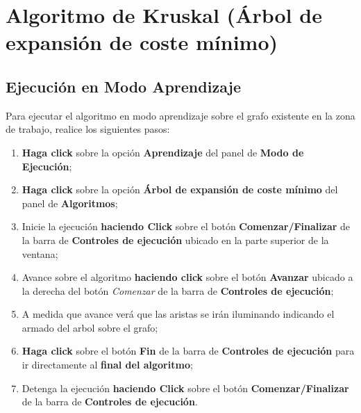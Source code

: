 \documentclass{book}
\begin{document}
%
%
\chapter{Algoritmo de Kruskal (Árbol de expansión de coste mínimo)}


\section{Ejecución en Modo Aprendizaje}

Para ejecutar el algoritmo en modo aprendizaje sobre el grafo existente en la zona de trabajo, realice los siguientes pasos:
\medskip

\begin{enumerate}
	\itemsep=8pt \topsep=0pt \partopsep=0pt \parskip=0pt \parsep=0pt

	\item \textbf{Haga click} sobre la opción \textbf{Aprendizaje} del panel de \textbf{Modo de Ejecución};

	\item \textbf{Haga click} sobre la opción \textbf{Árbol de expansión de coste mínimo} del panel de \textbf{Algoritmos};

	\item Inicie la ejecución \textbf{haciendo Click} sobre el botón \textbf{Comenzar/Finalizar} de la barra de \textbf{Controles de ejecución} ubicado en la parte superior de la ventana;

	\item Avance sobre el algoritmo \textbf{haciendo click} sobre el botón \textbf{Avanzar} ubicado a la derecha del botón \textit{Comenzar} de la barra de \textbf{Controles de ejecución};

	\item A medida que avance verá que las aristas se irán iluminando indicando el armado del arbol sobre el grafo;

	\item \textbf{Haga click} sobre el botón \textbf{Fin} de la barra de \textbf{Controles de ejecución} para ir directamente al \textbf{final del algoritmo};

	\item Detenga la ejecución \textbf{haciendo Click} sobre el botón \textbf{Comenzar/Finalizar} de la barra de \textbf{Controles de ejecución}.

\end{enumerate}
\medskip
\end{document}

